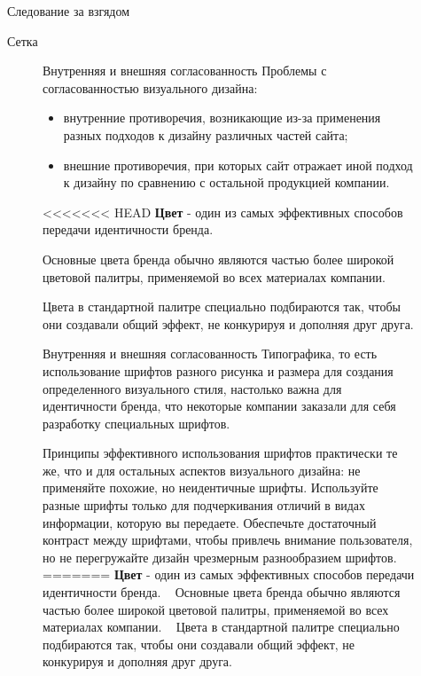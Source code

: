 \documentclass{beamer}
\begin{document}
\begin{frame}[t]{Следование за взгядом}
\begin{frame}[t]{Сетка}
\begin{figure}[h]
\begin{frame}[t]{Внутренняя и внешняя согласованность}
	Проблемы с согласованностью визуального дизайна:
	\begin{itemize}
		\item внутренние противоречия, возникающие из-за применения разных подходов к дизайну различных частей сайта;
		\item внешние противоречия, при которых сайт отражает иной подход к дизайну по сравнению с остальной продукцией компании.
	\end{itemize}
<<<<<<< HEAD
	\textbf{Цвет} - один из самых эффективных способов передачи идентичности бренда.
	
	Основные цвета бренда обычно являются частью более широкой цветовой палитры, применяемой во всех материалах компании. 

	Цвета в стандартной палитре специально подбираются так, чтобы они создавали общий эффект, не конкурируя и дополняя друг друга.
\end{frame}

\begin{frame}[t]{Внутренняя и внешняя согласованность}
Типографика, то есть использование шрифтов разного рисунка и размера для создания определенного визуального стиля, настолько важна для идентичности бренда, что некоторые компании заказали для себя разработку специальных шрифтов. 

Принципы эффективного использования шрифтов практически те же, что и для остальных аспектов визуального дизайна: 
не применяйте похожие, но неидентичные шрифты. 
Используйте разные шрифты только для подчеркивания отличий в видах информации, которую вы передаете.
Обеспечьте достаточный контраст между шрифтами, чтобы привлечь внимание пользователя, но не перегружайте дизайн чрезмерным разнообразием шрифтов.
=======
	\textbf{Цвет} - один из самых эффективных способов передачи идентичности бренда.	
	~
	Основные цвета бренда обычно являются частью более широкой цветовой палитры, применяемой во всех материалах компании. 
	~
	Цвета в стандартной палитре специально подбираются так, чтобы они создавали общий эффект, не конкурируя и дополняя друг друга.
\end{frame}


\end{figure}
\end{frame}
\end{frame}
\end{document}
